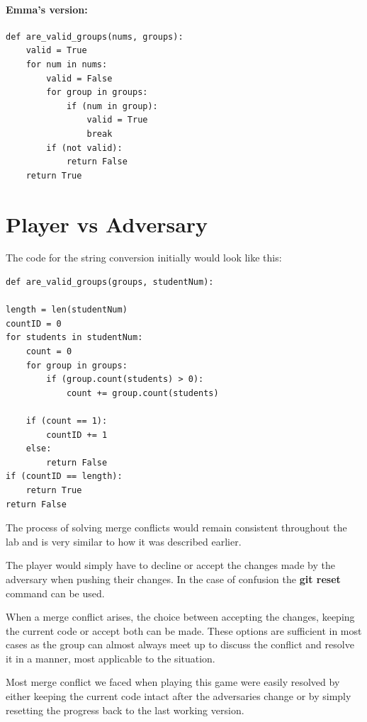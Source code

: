\documentclass[twocolumn, 10pt]{article}
\begin{document}
\paragraph{Emma's version:}

\footnotesize
\begin{verbatim}
def are_valid_groups(nums, groups):
    valid = True
    for num in nums:
        valid = False
        for group in groups:
            if (num in group): 
                valid = True
                break
        if (not valid):
            return False
    return True
\end{verbatim}
\normalsize

\section{Player vs Adversary}

The code for the string conversion initially would look like this:

\footnotesize
\begin{verbatim}
def are_valid_groups(groups, studentNum):

length = len(studentNum)
countID = 0   
for students in studentNum:
    count = 0
    for group in groups:
        if (group.count(students) > 0):
            count += group.count(students)

    if (count == 1):
        countID += 1
    else:
        return False
if (countID == length):
    return True
return False
\end{verbatim}
\normalsize

The process of solving merge conflicts would remain consistent throughout the lab and is very similar to how it was described earlier.

The player would simply have to decline or accept the changes made by the adversary when pushing their changes. In the case of confusion the \textbf{git reset} command can be used.

When a merge conflict arises, the choice between accepting the changes, keeping the current code or accept both can be made. These options are sufficient in most cases as the group can almost always meet up to discuss the conflict and resolve it in a manner, most applicable to the situation.

Most merge conflict we faced when playing this game were easily resolved by either keeping the current code intact after the adversaries change or by simply resetting the progress back to the last working version.
\end{document}
